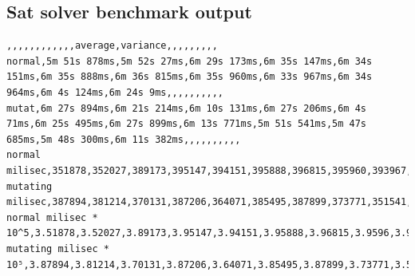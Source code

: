 \documentclass[
]{article}
\begin{document}
\hypertarget{sat-solver-benchmark-output}{%
\subsection{Sat solver benchmark
output}\label{sat-solver-benchmark-output}}

\begin{verbatim}
,,,,,,,,,,,,average,variance,,,,,,,,,
normal,5m 51s 878ms,5m 52s 27ms,6m 29s 173ms,6m 35s 147ms,6m 34s 151ms,6m 35s 888ms,6m 36s 815ms,6m 35s 960ms,6m 33s 967ms,6m 34s 964ms,6m 4s 124ms,6m 24s 9ms,,,,,,,,,,
mutat,6m 27s 894ms,6m 21s 214ms,6m 10s 131ms,6m 27s 206ms,6m 4s 71ms,6m 25s 495ms,6m 27s 899ms,6m 13s 771ms,5m 51s 541ms,5m 47s 685ms,5m 48s 300ms,6m 11s 382ms,,,,,,,,,,
normal milisec,351878,352027,389173,395147,394151,395888,396815,395960,393967,394964,364124,384008.545454545,337134927.872727,,,,,,,,,
mutating milisec,387894,381214,370131,387206,364071,385495,387899,373771,351541,347685,348300,371382.454545455,264041625.672727,,,,,,,,,
normal milisec * 10^5,3.51878,3.52027,3.89173,3.95147,3.94151,3.95888,3.96815,3.9596,3.93967,3.94964,3.64124,3.84008545454545,0.0337134927872727,,,,,,,,,
mutating milisec * 10⁵,3.87894,3.81214,3.70131,3.87206,3.64071,3.85495,3.87899,3.73771,3.51541,3.47685,3.483,3.71382454545455,0.0264041625672727,,,,,,,,,
\end{verbatim}
\end{document}
